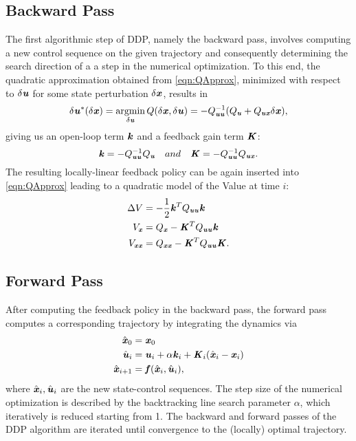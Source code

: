 \subsection{Backward Pass}
The first algorithmic step of \gls{DDP}, namely the backward pass, involves computing a new control sequence on the given trajectory and consequently determining the search direction of a a step in the numerical optimization. To this end, the quadratic approximation obtained from \cref{eqn:QApprox}, minimized with respect to $\delta\bm{\mathit{u}}$ for some state perturbation $\delta\bm{\mathit{x}}$, results in
\begin{equation*}
\delta\bm{\mathit{u}}^*(\delta\bm{\mathit{x}})=\operatorname*{argmin}_{\delta\bm{\mathit{u}}}Q(\delta\bm{\mathit{x}},\delta\bm{\mathit{u}})=-Q_{\bm{\mathit{u}}\bm{\mathit{u}}}^{-1}(Q_{\bm{\mathit{u}}}+Q_{\bm{\mathit{u}}\bm{\mathit{x}}}\delta\bm{\mathit{x}}),
\end{equation*}
giving us an open-loop term $\bm{\mathit{k}}$ and a feedback gain term $\bm{\mathit{K}}$:
\begin{equation*}
\bm{\mathit{k}}=-Q_{\bm{\mathit{u}}\bm{\mathit{u}}}^{-1}Q_{\bm{\mathit{u}}}\quad and \quad \bm{\mathit{K}}=-Q_{\bm{\mathit{u}}\bm{\mathit{u}}}^{-1}Q_{\bm{\mathit{u}}\bm{\mathit{x}}}.
\end{equation*}
The resulting locally-linear feedback policy can be again inserted into \cref{eqn:QApprox} leading to a quadratic model of the Value at time $i$: 
\begin{align*}
 \Delta V &= -\dfrac{1}{2}\bm{\mathit{k}}^TQ_{\bm{\mathit{u}}\bm{\mathit{u}}}\bm{\mathit{k}} \\
 V_{\bm{\mathit{x}}} &= Q_{\bm{\mathit{x}}}-\bm{\mathit{K}}^TQ_{\bm{\mathit{u}}\bm{\mathit{u}}}\bm{\mathit{k}} \\
 V_{\bm{\mathit{x}}\bm{\mathit{x}}} &= Q_{\bm{\mathit{x}}\bm{\mathit{x}}}-\bm{\mathit{K}}^TQ_{\bm{\mathit{u}}\bm{\mathit{u}}}\bm{\mathit{\bm{\mathit{K}}}}.
\end{align*}

\subsection{Forward Pass}
After computing the feedback policy in the backward pass, the forward pass computes a corresponding trajectory by integrating the dynamics via
\begin{align*}
\hat{\bm{\mathit{x}}}_0 		&=\bm{\mathit{x}}_0 \\
\hat{\bm{\mathit{u}}}_i 		&=\bm{\mathit{u}}_i+\alpha\bm{\mathit{k}}_i+\bm{\mathit{K}}_i(\hat{\bm{\mathit{x}}}_i-\bm{\mathit{x}}_i) \\
\hat{\bm{\mathit{x}}}_{i+1}	&=\bm{\mathit{f}}(\hat{\bm{\mathit{x}}}_i,\hat{\bm{\mathit{u}}}_i),
\end{align*}
where $\hat{\bm{\mathit{x}}}_i,\hat{\bm{\mathit{u}}}_i$ are the new state-control sequences. The step size of the numerical optimization is described by the backtracking line search parameter $\alpha$, which iteratively is reduced starting from 1. The backward and forward passes of the \gls{DDP} algorithm are iterated until convergence to the (locally) optimal trajectory.  

